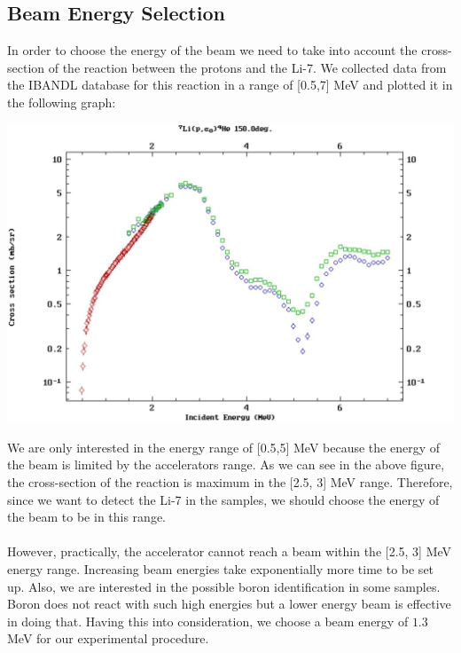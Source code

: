 \documentclass{article}
\begin{document}
\begin{multicols}{2}
\subsection{Beam Energy Selection}
    \label{sec:beamenergyselection}

In order to choose the energy of the beam we need to take into account the cross-section of the reaction between the protons and the Li-7. We collected data from the IBANDL database for this reaction in a range of [0.5,7] MeV and plotted it in the following graph:

\begin{center}
    \label{TT_21}
    \centering
    \includegraphics[scale = 0.17]{../images/Li_crosssection_energy.jpeg}
\end{center}

We are only interested in the energy range of [0.5,5] MeV because the energy of the beam is limited by the accelerators range. As we can see in the above figure, the cross-section of the reaction is maximum in the [2.5, 3] MeV range. Therefore, since we want to detect the Li-7 in the samples, we should choose the energy of the beam to be in this range.
\paragraph{}
However, practically, the accelerator cannot reach a beam within the [2.5, 3] MeV energy range. Increasing beam energies take exponentially more time to be set up. Also, we are interested in the possible boron identification in some samples. Boron does not react with such high energies but a lower energy beam is effective in doing that.
Having this into consideration, we choose a beam energy of $1.3$ MeV for our experimental procedure.


\end{multicols}
\end{document}
